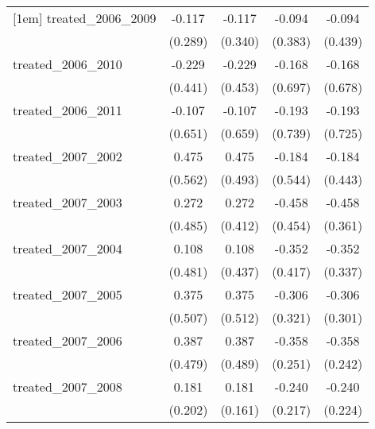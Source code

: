 {\begin{tabular}{l*{4}{c}}
[1em]
treated\_2006\_2009&      -0.117         &      -0.117         &      -0.094         &      -0.094         \\
            &     (0.289)         &     (0.340)         &     (0.383)         &     (0.439)         \\
[1em]
treated\_2006\_2010&      -0.229         &      -0.229         &      -0.168         &      -0.168         \\
            &     (0.441)         &     (0.453)         &     (0.697)         &     (0.678)         \\
[1em]
treated\_2006\_2011&      -0.107         &      -0.107         &      -0.193         &      -0.193         \\
            &     (0.651)         &     (0.659)         &     (0.739)         &     (0.725)         \\
[1em]
treated\_2007\_2002&       0.475         &       0.475         &      -0.184         &      -0.184         \\
            &     (0.562)         &     (0.493)         &     (0.544)         &     (0.443)         \\
[1em]
treated\_2007\_2003&       0.272         &       0.272         &      -0.458         &      -0.458         \\
            &     (0.485)         &     (0.412)         &     (0.454)         &     (0.361)         \\
[1em]
treated\_2007\_2004&       0.108         &       0.108         &      -0.352         &      -0.352         \\
            &     (0.481)         &     (0.437)         &     (0.417)         &     (0.337)         \\
[1em]
treated\_2007\_2005&       0.375         &       0.375         &      -0.306         &      -0.306         \\
            &     (0.507)         &     (0.512)         &     (0.321)         &     (0.301)         \\
[1em]
treated\_2007\_2006&       0.387         &       0.387         &      -0.358         &      -0.358         \\
            &     (0.479)         &     (0.489)         &     (0.251)         &     (0.242)         \\
[1em]
treated\_2007\_2008&       0.181         &       0.181         &      -0.240         &      -0.240         \\
            &     (0.202)         &     (0.161)         &     (0.217)         &     (0.224)         \\

\end{tabular}}
